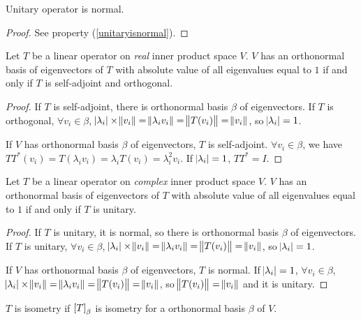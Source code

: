 \begin{theorem}
    Unitary operator is normal.    
\end{theorem}
\begin{proof}
    See  property (\ref{unitaryisnormal}).
\end{proof}



\begin{theorem}
    Let $T$ be a linear operator on \emph{real} inner product space $V$. $V$ has an orthonormal basis of eigenvectors of $T$ with absolute value of all eigenvalues equal to $1$ if and only if $T$ is self-adjoint and orthogonal.    
\end{theorem}
\begin{proof}
    If $T$ is self-adjoint, there is orthonormal basis $\beta$ of eigenvectors. If $T$ is orthogonal, $\forall v_i \in \beta$, $\abs{\lambda_i} \times \norm{v_i} = \norm{\lambda_i v_i} = \norm{T(v_i)} = \norm{v_i}$, so $\abs{\lambda_i} = 1$.
    
    If $V$ has orthonormal basis $\beta$ of eigenvectors, $T$ is self-adjoint. $\forall v_i \in \beta$, we have $TT^* (v_i) = T(\lambda_i v_i ) = \lambda_i T(v_i) = \lambda_i^2 v_i$. If $\abs{\lambda_i} = 1$, $TT^* = I$.
\end{proof}

\begin{theorem}
    Let $T$ be a linear operator on \emph{complex} inner product space $V$. $V$ has an orthonormal basis of eigenvectors of $T$ with absolute value of all eigenvalues equal to  $1$ if and only if $T$ is unitary.
\end{theorem}
\begin{proof}
    If $T$ is unitary, it is normal, so there is orthonormal basis $\beta$ of eigenvectors. If $T$ is unitary, $\forall v_i \in \beta$, $\abs{\lambda_i} \times \norm{v_i} = \norm{\lambda_i v_i} = \norm{T(v_i)} = \norm{v_i}$, so $\abs{\lambda_i} = 1$.
    
    If $V$ has orthonormal basis $\beta$ of eigenvectors, $T$ is normal. If $\abs{\lambda_i} = 1$, $\forall v_i \in \beta$, $\abs{\lambda_i} \times \norm{v_i} = \norm{\lambda_i v_i} = \norm{T(v_i)} = \norm{v_i}$, so $\norm{T(v_i)} = \norm{v_i}$ and it is unitary.
\end{proof}

\begin{theorem}
    $T$ is isometry if $\coordinate{T}_\beta$ is isometry for a orthonormal basis $\beta$ of $V$.
\end{theorem}

